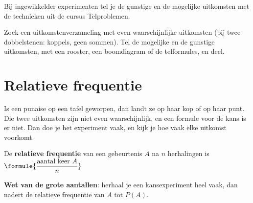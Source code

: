 \begin{oefeningen}
\end{oefeningen}

Bij ingewikkelder experimenten tel je de gunstige en de mogelijke uitkomsten met de technieken uit de cursus Telproblemen.


\begin{werkwijze}
Zoek een uitkomstenverzameling met even waarschijnlijke uitkomsten (bij twee dobbelstenen: koppels, geen sommen). Tel de mogelijke en de gunstige uitkomsten, met een rooster, een boomdiagram of de telformules, en deel.
\end{werkwijze}


\begin{oefeningen}

\end{oefeningen}

\section{Relatieve frequentie}

Is een punaise op een tafel geworpen, dan landt ze op haar kop of op haar punt. Die twee uitkomsten zijn niet even waarschijnlijk, en een formule voor de kans is er niet. Dan doe je het experiment vaak, en kijk je hoe vaak elke uitkomst voorkomt.

\begin{theorie}
De \textbf{\textcolor{accent}{relatieve frequentie}} van een gebeurtenis $A$ na $n$ herhalingen is \quad $\formule{\dfrac{\text{aantal keer } A}{n}}$

\vspace{1mm}
\textbf{\textcolor{accent}{Wet van de grote aantallen}}: herhaal je een kansexperiment heel vaak, dan nadert de relatieve frequentie van $A$ tot $P(A)$.
\end{theorie}

